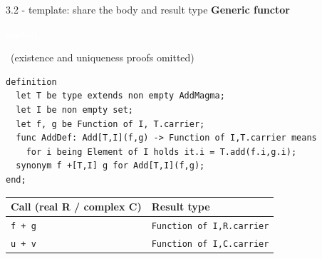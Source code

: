 \documentclass[aspectratio=169,11pt]{beamer}
\newcommand{\statusbadge}[2]{\colorbox{#1}{\textcolor{white}{\strut\scriptsize\sffamily\bfseries #2}}}
\newcommand{\badgeSketch}{\statusbadge{orange!75!black}{sketch}}
\begin{document}
\begin{frame}[fragile,t]{3.2 - template: share the body and result type}
\smallskip
\textbf{Generic functor}~\badgeSketch~{\footnotesize(existence and uniqueness proofs omitted)}
\begin{lstlisting}[language={mizar},basicstyle=\ttfamily\footnotesize]
definition
  let T be type extends non empty AddMagma;
  let I be non empty set;
  let f, g be Function of I, T.carrier;
  func AddDef: Add[T,I](f,g) -> Function of I,T.carrier means
    for i being Element of I holds it.i = T.add(f.i,g.i);
  synonym f +[T,I] g for Add[T,I](f,g);
end;
\end{lstlisting}
\par{}
\begin{footnotesize}
\setlength{\tabcolsep}{3pt}
\renewcommand{\arraystretch}{1.15}
\begin{tabularx}{\textwidth}{l>{\raggedright\arraybackslash}X}
\toprule
\textbf{Call (real R / complex C)\footnotemark[1]} & \textbf{Result type} \\
\midrule
\texttt{f + g} & \texttt{Function of I,R.carrier} \\
\texttt{u + v} & \texttt{Function of I,C.carrier} \\
\bottomrule
\end{tabularx}
\end{footnotesize}


\end{frame}
\end{document}
